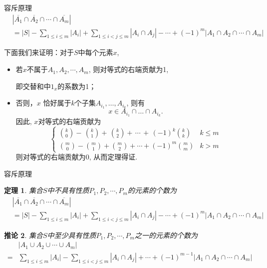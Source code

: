 \documentclass[punct]{ctexbeamer}
\newtheorem{thm}{定理}[]
\newtheorem{cor}[thm]{推论}
\begin{document}
\begin{frame}
   	\begin{block}{容斥原理}
\[\begin{aligned}
           &\left|\overline{A_{1}} \cap \overline{A_{2}} \cap \cdots \cap \overline{A_{m}}\right| \\
           &=|S|-\sum_{1 \leq i \leq m}\left|A_{i}\right|+\sum_{1 \leq i<j \leq m}\left|A_{i} \cap A_{j}\right|-\cdots+(-1)^{m}\left|A_{1} \cap A_{2} \cap \cdots \cap A_{m}\right|
       \end{aligned}\]
   \end{block}
下面我们来证明：对于$S$中每个元素$x$,
\begin{itemize}
    \item 若$x$不属于$A_{1}, A_{2}, \cdots, A_{m}$, 则对等式的右端贡献为1,

    即交替和中$1_x$的系数为1；

    \item 否则，$x$ 恰好属于$k$个子集$A_{i_{1}}, \ldots, A_{i_{k}}$, 则有$$x\in A_{i_{1}}\cap \ldots \cap A_{i_{k}}.$$
\pause
    因此, $x$对等式的右端贡献为
$$\begin{cases}\binom{k}{0}-\,\binom{k}{1}+\,\binom{k}{2}+\, \cdots\,+\, (-1)^k\binom{k}{k} & k \leq m \\ \binom{m}{0}-\binom{m}{1}+\binom{m}{2}+\cdots + (-1)^m\binom{m}{m} & k>m\end{cases}$$
    则对等式的右端贡献为0, 从而定理得证.
\end{itemize}

\end{frame}
	\begin{frame}{容斥原理}
		\begin{thm}
			集合$S$中不具有性质$P_{1},P_{2},\cdots,P_{m}$的元素的个数为\[\begin{aligned}
			&\left|\overline{A_{1}} \cap \overline{A_{2}} \cap \cdots \cap \overline{A_{m}}\right| \\
			&=|S|-\sum_{1 \leq i \leq m}\left|A_{i}\right|+\sum_{1 \leq i<j \leq m}\left|A_{i} \cap A_{j}\right|-\cdots+(-1)^{m}\left|A_{1} \cap A_{2} \cap \cdots \cap A_{m}\right|
			\end{aligned}\]
		\end{thm}
\begin{cor}
	集合$S$中至少具有性质$P_{1},P_{2},\cdots,P_{m}$之一的元素的个数为
	$$
	\begin{aligned}
	&\left|A_{1} \cup A_{2} \cup \cdots \cup A_{m}\right| \\
	=& \sum_{1 \leq i \leq m}\left|A_{i}\right|-\sum_{1 \leq i<j \leq m}\left|A_{i} \cap A_{j}\right|+\cdots+(-1)^{m-1}\left|A_{1} \cap A_{2} \cap \cdots \cap A_{m}\right|
	\end{aligned}
	$$
\end{cor}
\end{frame}
\end{document}
